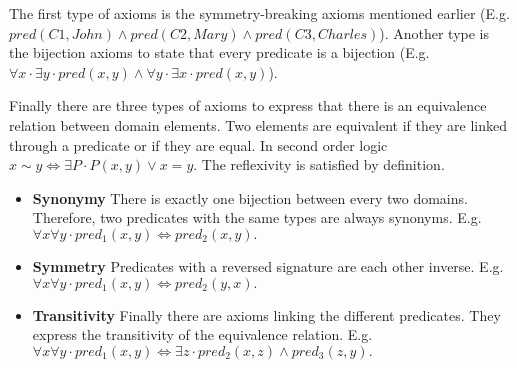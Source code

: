 The first type of axioms is the symmetry-breaking axioms mentioned earlier (E.g. $pred(C1, John) \land pred(C2, Mary) \land pred(C3, Charles)$). Another type is the bijection axioms to state that every predicate is a bijection (E.g. $\forall x \cdot \exists y \cdot pred(x, y) \land \forall y \cdot \exists x \cdot pred(x, y)$).

Finally there are three types of axioms to express that there is an equivalence relation between domain elements. Two elements are equivalent if they are linked through a predicate or if they are equal. In second order logic $x \sim y \Leftrightarrow \exists P \cdot P(x, y) \lor x = y$. The reflexivity is satisfied by definition.

\begin{itemize}
  \item \textbf{Synonymy} There is exactly one bijection between every two domains. Therefore, two predicates with the same types are always synonyms. E.g. $\forall x \forall y \cdot pred_1(x, y) \Leftrightarrow pred_2(x, y).$
  \item \textbf{Symmetry} Predicates with a reversed signature are each other inverse. E.g. $\forall x \forall y \cdot pred_1(x, y) \Leftrightarrow pred_2(y, x).$
  \item \textbf{Transitivity} Finally there are axioms linking the different predicates. They express the transitivity of the equivalence relation. E.g. $\forall x \forall y \cdot pred_1(x, y) \Leftrightarrow \exists z \cdot pred_2(x, z) \land pred_3(z, y).$
\end{itemize}
